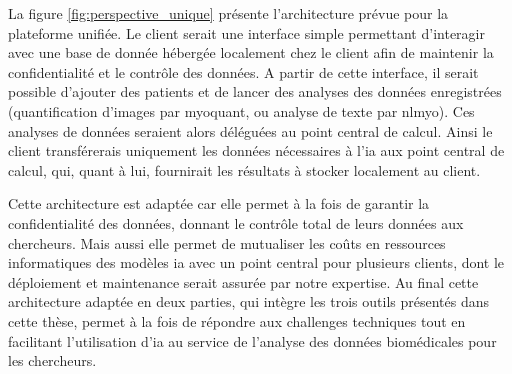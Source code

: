 La figure \ref{fig:perspective_unique} présente l'architecture prévue pour la plateforme unifiée. Le client serait une interface simple permettant d'interagir avec une base de donnée hébergée localement chez le client afin de maintenir la confidentialité et le contrôle des données. A partir de cette interface, il serait possible d'ajouter des patients et de lancer des analyses des données enregistrées (quantification d'images par \gls{myoquant}, ou analyse de texte par \gls{nlmyo}). Ces analyses de données seraient alors déléguées au point central de calcul. Ainsi le client transférerais uniquement les données nécessaires à l'\gls{ia} aux point central de calcul, qui, quant à lui, fournirait les résultats à stocker localement au client.

Cette architecture est adaptée car elle permet à la fois de garantir la confidentialité des données, donnant le contrôle total de leurs données aux chercheurs. Mais aussi elle permet de mutualiser les coûts en ressources informatiques des modèles \gls{ia} avec un point central pour plusieurs clients, dont le déploiement et maintenance serait assurée par notre expertise. Au final cette architecture adaptée en deux parties, qui intègre les trois outils présentés dans cette thèse, permet à la fois de répondre aux challenges techniques tout en facilitant l'utilisation d'\gls{ia} au service de l'analyse des données biomédicales pour les chercheurs.